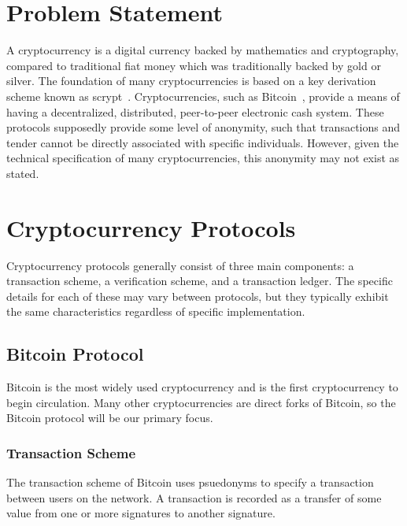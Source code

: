 \documentclass[11pt]{article}
\begin{document}
\section{Problem Statement}
A cryptocurrency is a digital currency backed by mathematics and
cryptography, compared to traditional fiat money which was traditionally backed by gold
or silver. The foundation of many cryptocurrencies is based on a key derivation
scheme known as scrypt~\cite{percival09}.
Cryptocurrencies, such as Bitcoin~\cite{nakamoto08}, provide a means of having a
decentralized, distributed, peer-to-peer electronic cash system. These protocols
supposedly provide some level of anonymity, such that transactions and tender
cannot be directly associated with specific individuals. However, given the
technical specification of many cryptocurrencies, this anonymity may not exist
as stated.

\section{Cryptocurrency Protocols}
Cryptocurrency protocols generally consist of three main components: a
transaction scheme, a verification scheme, and a transaction ledger. The specific
details for each of these may vary between protocols, but they typically exhibit
the same characteristics regardless of specific implementation.

\subsection{Bitcoin Protocol}
Bitcoin is the most widely used cryptocurrency and is the first cryptocurrency
to begin circulation. Many other cryptocurrencies are direct forks of Bitcoin,
so the Bitcoin protocol will be our primary focus.

\subsubsection{Transaction Scheme}
The transaction scheme of Bitcoin uses psuedonyms to specify a transaction
between users on the network. A transaction is recorded as a transfer of some
value from one or more signatures to another signature.
\end{document}

